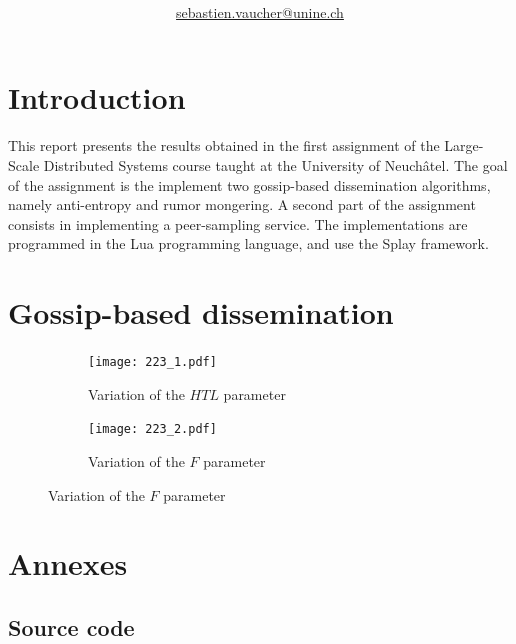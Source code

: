 \documentclass[11pt,a4paper]{scrartcl}
\author{\myauthor\\ \href{mailto:sebastien.vaucher@unine.ch}{sebastien.vaucher@unine.ch}}
\title{\huge \textbf{\mytitle}}
\begin{document}
\nocite{*}

\begin{titlingpage}

\begin{otherlanguage}{australian}
\maketitle
\end{otherlanguage}

\setcounter{tocdepth}{1}
\tableofcontents

\begin{figure}[b]
\centering
{}
\qquad
{}
\end{figure}

\end{titlingpage}

\pagebreak

\section{Introduction}

This report presents the results obtained in the first assignment of the Large-Scale Distributed Systems course taught at the University of Neuchâtel. The goal of the assignment is the implement two gossip-based dissemination algorithms, namely anti-entropy and rumor mongering. A second part of the assignment consists in implementing a peer-sampling service. The implementations are programmed in the Lua programming language, and use the Splay framework.

\section{Gossip-based dissemination}

\begin{figure}

\centering

\begin{subfigure}[b]{0.5\linewidth}
	\centering
	\texttt{[image: 223\_1.pdf]}
	\caption{Variation of the $HTL$ parameter}
	\label{fig:223-1}
\end{subfigure}
\begin{subfigure}[b]{0.5\linewidth}
	\centering
	\texttt{[image: 223\_2.pdf]}
	\caption{Variation of the $F$ parameter}
	\label{fig:223-2}
\end{subfigure}
\end{figure}

\section{Annexes}

\subsection{Source code}

\end{document}
